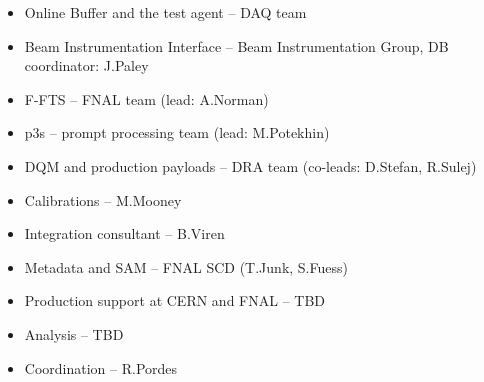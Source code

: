\documentclass[pdftex,12pt,letter]{article}
\begin{document}
\begin{itemize}

\item Online Buffer and the test agent -- DAQ team

\item Beam Instrumentation Interface -- Beam Instrumentation Group, DB coordinator: J.Paley

\item F-FTS -- FNAL team (lead: A.Norman)

\item p3s -- prompt processing team (lead: M.Potekhin)

\item DQM and production payloads -- DRA team (co-leads: D.Stefan, R.Sulej)

\item Calibrations -- M.Mooney

\item Integration consultant -- B.Viren

\item Metadata and SAM -- FNAL SCD (T.Junk, S.Fuess)


\item Production support at CERN and FNAL -- TBD

\item Analysis -- TBD

\item Coordination -- R.Pordes


\end{itemize}
\end{document}
